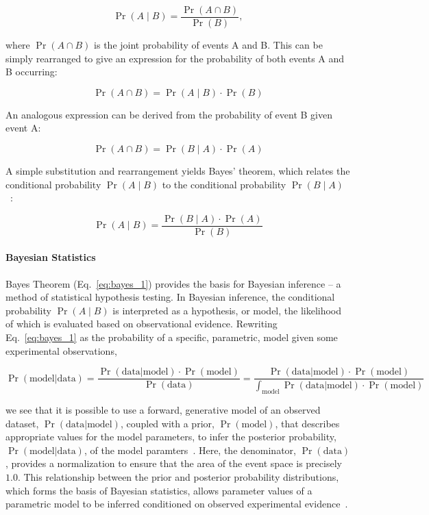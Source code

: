 \begin{equation}
\Pr(A \mid B) = \frac{\Pr(A \cap B)}{\Pr(B)},
\label{eq:conditional}
\end{equation}

 where $\Pr(A \cap B)$ is the joint probability of events A and B. This can be simply rearranged to give an expression for the probability of both events A and B occurring:

\begin{equation}
\Pr(A \cap B) = \Pr(A \mid B) \cdot \Pr(B) 
\label{eq:conditional_and}
\end{equation}

An analogous expression can be derived from the probability of event B given event A:


\begin{equation}
\Pr(A \cap B) = \Pr(B \mid A) \cdot \Pr(A) 
\label{eq:conditional_and}
\end{equation}

A simple substitution and rearrangement yields Bayes' theorem, which relates the conditional probability $\Pr(A \mid B)$ to the conditional probability $\Pr(B \mid A)$~\cite{barberBRML2012}:

\begin{equation}
\Pr(A \mid B) = \frac{\Pr(B \mid A) \cdot \Pr(A)}{\Pr(B)} 
\label{eq:bayes_1}
\end{equation}
 
\paragraph{Bayesian Statistics}
Bayes Theorem (Eq.~\ref{eq:bayes_1}) provides the basis for Bayesian inference -- a method of statistical hypothesis testing. In Bayesian inference, the conditional probability $\Pr(A \mid B)$ is interpreted as a hypothesis, or model, the likelihood of which is evaluated based on observational evidence. Rewriting Eq.~\ref{eq:bayes_1} as the probability of a specific, parametric, model given some experimental observations, 

\begin{equation}
\Pr(\text{model}|\text{data}) = \frac{\Pr(\text{data}|\text{model}) \cdot \Pr(\text{model})}{\Pr(\text{data})} = \frac{\Pr(\text{data}|\text{model}) \cdot \Pr(\text{model})}{\int_{\text{model}}\Pr(\text{data}|\text{model}) \cdot \Pr(\text{model})} 
\label{eq:bayes_model}
\end{equation}

we see that it is possible to use a forward, generative model of an observed dataset, $\Pr(\text{data}|\text{model})$, coupled with a prior, $\Pr(\text{model})$, that describes appropriate values for the model parameters, to infer the posterior probability, $\Pr(\text{model}|\text{data})$, of the model paramters~\cite{barberBRML2012}. Here, the denominator, $\Pr(\text{data})$, provides a normalization to ensure that the area of the event space is precisely $1.0$. This relationship between the prior and posterior probability distributions, which forms the basis of Bayesian statistics, allows parameter values of a parametric model to be inferred conditioned on observed experimental evidence~\cite{morris1982}.

